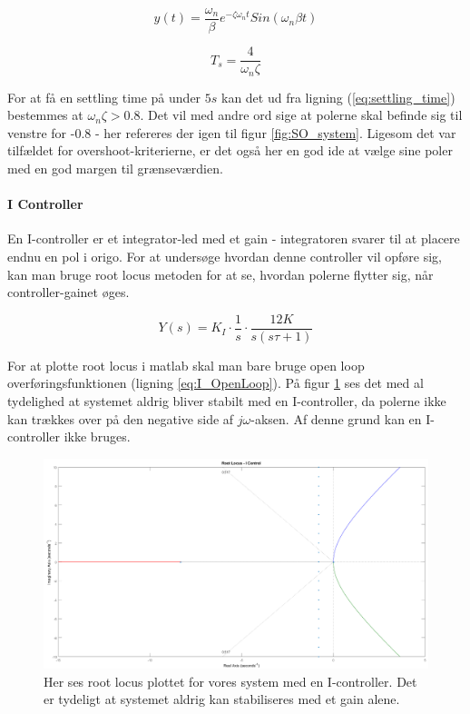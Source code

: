 \begin{equation}\label{eq:impulse_response}
y(t)=\frac{\omega_{n}}{\beta}e^{-\zeta\omega_{n}t}Sin(\omega_{n}\beta t)
\end{equation}

\begin{equation}\label{eq:settling_time}
T_{s}=\frac{4}{\omega_{n}\zeta}
\end{equation}

For at få en settling time på under $5s$ kan det ud fra ligning (\ref{eq:settling_time}) bestemmes at $\omega_{n}\zeta > 0.8$. Det vil med andre ord sige at polerne skal befinde sig til venstre for -0.8 - her refereres der igen til figur \ref{fig:SO_system}. Ligesom det var tilfældet for overshoot-kriterierne, er det også her en god ide at vælge sine poler med en god margen til grænseværdien.

\paragraph{I Controller}

En I-controller er et integrator-led med et gain - integratoren svarer til at placere endnu en pol i origo. For at undersøge hvordan denne controller vil opføre sig, kan man bruge root locus metoden for at se, hvordan polerne flytter sig, når controller-gainet øges. 

\begin{equation}\label{eq:I_OpenLoop}
Y(s)=K_{I}\cdot\frac{1}{s}\cdot\frac{12K}{s(s\tau+1)}
\end{equation}

For at plotte root locus i matlab skal man bare bruge open loop overføringsfunktionen (ligning \ref{eq:I_OpenLoop}). På figur \ref{fig:I_rlocus} ses det med al tydelighed at systemet aldrig bliver stabilt med en I-controller, da polerne ikke kan trækkes over på den negative side af $j\omega$-aksen. Af denne grund kan en I-controller ikke bruges.

\begin{figure}[h]
	\begin{center}
		\includegraphics[scale=0.35]{Billeder/I_rlocus.PNG}
	\end{center}
\caption{Her ses root locus plottet for vores system med en I-controller. Det er tydeligt at systemet aldrig kan stabiliseres med et gain alene.}
\label{fig:I_rlocus}
\end{figure}


